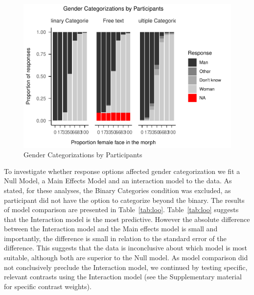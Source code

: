 \documentclass[
  man]{apa7}
\begin{document}
\begin{figure}
\centering
\includegraphics{resp_opts_manus23022_files/figure-latex/descriptives-1.pdf}
\caption{\label{fig:descriptives}Gender Categorizations by Participants}
\end{figure}

To investigate whether response options affected gender categorization we fit a Null Model, a Main Effects Model and an interaction model to the data. As stated, for these analyses, the Binary Categories condition was excluded, as participant did not have the option to categorize beyond the binary. The results of model comparison are presented in Table~\ref{tab:loo}.
Table~\ref{tab:loo} suggests that the Interaction model is the most predictive. However the absolute difference between the Interaction model and the Main effects model is small and importantly, the difference is small in relation to the standard error of the difference. This suggests that the data is inconclusive about which model is most suitable, although both are superior to the Null model. As model comparison did not conclusively preclude the Interaction model, we continued by testing specific, relevant contrasts using the Interaction model (see the Supplementary material for specific contrast weights).
\end{document}
